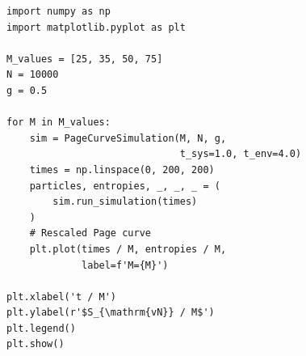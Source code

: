 \documentclass[12pt,oneside,openright]{report}
\theoremstyle{definition}
\theoremstyle{plain}
\theoremstyle{remark}
\begin{document}
\begin{lstlisting}[caption={Example: computing the Page curve for several system sizes.}]
import numpy as np
import matplotlib.pyplot as plt

M_values = [25, 35, 50, 75]
N = 10000
g = 0.5

for M in M_values:
    sim = PageCurveSimulation(M, N, g,
                              t_sys=1.0, t_env=4.0)
    times = np.linspace(0, 200, 200)
    particles, entropies, _, _, _ = (
        sim.run_simulation(times)
    )
    # Rescaled Page curve
    plt.plot(times / M, entropies / M,
             label=f'M={M}')

plt.xlabel('t / M')
plt.ylabel(r'$S_{\mathrm{vN}} / M$')
plt.legend()
plt.show()
\end{lstlisting}
\end{document}
